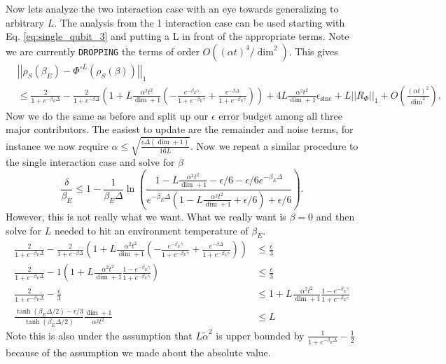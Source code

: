 \documentclass{article}
\newcommand{\norm}[1]{\left| \left| #1 \right| \right|}
\newcommand{\bigo}[1]{O\left( #1 \right)}
\DeclareMathOperator{\sinc}{sinc}
\begin{document}
Now lets analyze the two interaction case with an eye towards generalizing to arbitrary $L$. The analysis from the 1 interaction case can be used starting with Eq. \eqref{eq:single_qubit_3} and putting a L in front of the appropriate terms. Note we are currently \verb|DROPPING| the terms of order $\bigo{(\alpha t)^4 / \dim^2}$. This gives
\begin{align}
    &\norm{\rho_S(\beta_E) - \Phi^{\circ L} (\rho_S(\beta))}_1 \\
    &\leq \frac{2}{1 + e^{-\beta_E \Delta}} -  \frac{2}{1 + e^{-\beta \Delta}} \left(1 + L\frac{\alpha^2 t^2}{\dim + 1} \left(-\frac{e^{-\beta_E \gamma}}{1 + e^{-\beta_E \gamma}} + \frac{e^{-\beta \Delta}}{1 + e^{-\beta_E \gamma}} \right) \right) + 4 L\frac{\alpha^2 t^2}{\dim + 1} \epsilon_{\sinc} + L\norm{R_{\Phi}}_1 + \bigo{\frac{(\alpha t)^2}{\dim ^2}} .
\end{align}
Now we do the same as before and split up our $\epsilon$ error budget among all three major contributors. The easiest to update are the remainder and noise terms, for instance we now require $\alpha \leq \sqrt{\frac{\epsilon \Delta (\dim + 1)}{16 L}}$. Now we repeat a similar procedure to the single interaction case and solve for $\beta$
\begin{equation}
    \frac{\delta}{\beta_E} \le 1 - \frac{1}{\beta_E \Delta}  \ln \left( \frac{1 - L\frac{\alpha^2 t^2}{\dim + 1} - \epsilon/ 6 - \epsilon/6 e^{-\beta_E \Delta}}{e^{-\beta_E \Delta}(1 - L\frac{\alpha^2 t^2}{\dim + 1} + \epsilon/6) + \epsilon / 6} \right).
\end{equation}
However, this is not really what we want. What we really want is $\beta = 0$ and then solve for $L$ needed to hit an environment temperature of $\beta_E$.
\begin{align}
    \frac{2}{1 + e^{-\beta_E \Delta}} -  \frac{2}{1 + e^{-\beta \Delta}} \left(1 + L\frac{\alpha^2 t^2}{\dim + 1} \left(-\frac{e^{-\beta_E \gamma}}{1 + e^{-\beta_E \gamma}} + \frac{e^{-\beta \Delta}}{1 + e^{-\beta_E \gamma}} \right) \right) &\leq \frac{\epsilon}{3} \\
    \frac{2}{1 + e^{-\beta_E \Delta}} -  1 \left(1 + L\frac{\alpha^2 t^2}{\dim + 1} \frac{1 - e^{-\beta_E \gamma}}{1 + e^{-\beta_E \gamma}} \right) &\leq \frac{\epsilon}{3} \\
    \frac{2}{1 + e^{-\beta_E \Delta}} - \frac{\epsilon}{3} &\leq 1 + L \frac{\alpha^2 t^2}{\dim + 1} \frac{1 - e^{-\beta_E \gamma}}{1 + e^{-\beta_E \gamma}} \\
    \frac{\tanh(\beta_E \Delta / 2) - \epsilon / 3}{\tanh(\beta_E \Delta / 2)} \frac{\dim + 1}{\alpha^2 t^2} &\leq L
\end{align}
Note this is also under the assumption that $L \widetilde{\alpha}^2$ is upper bounded by $\frac{1}{1 + e^{-\beta_E \Delta}} - \frac{1}{2}$ because of the assumption we made about the absolute value. 
\end{document}
